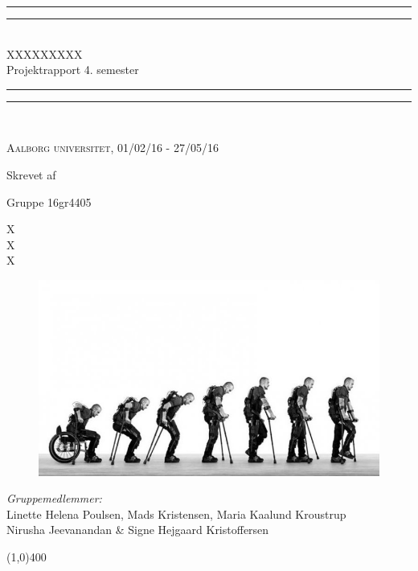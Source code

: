 \begin{center}
\vspace*{\baselineskip}
\rule{\textwidth}{1.6pt}\vspace*{-\baselineskip}\vspace*{2pt} %
\rule{\textwidth}{0.4pt}\\[\baselineskip] %

{\huge XXXXXXXXX\\[0.3\baselineskip] \LARGE Projektrapport 4. semester}\\[0.2\baselineskip] %

\rule{\textwidth}{0.4pt}\vspace*{-\baselineskip}\vspace{3.2pt} %
\rule{\textwidth}{1.6pt}\\[\baselineskip] %
\vspace*{3\baselineskip}

\scshape %
Aalborg universitet,  01/02/16 - 27/05/16\par %

\vspace*{2\baselineskip} %

Skrevet af \\
{\Large Gruppe 16gr4405\par}
\end{center} %
{\color{white}X \\ X \\ X \\}
\begin{figure}[H]
	\centering
	\begin{minipage}[b]{1\textwidth}
		\includegraphics[width=\textwidth]{figures/Forside}
	\end{minipage}
	\hfill
\end{figure}

\vspace*{\fill}
\begin{center}
	\textit{Gruppemedlemmer:}\\
	Linette Helena Poulsen, Mads Kristensen, Maria Kaalund Kroustrup \\
	Nirusha Jeevanandan \& Signe Hejgaard Kristoffersen
\end{center}
\begin{center}
\line(1,0){400}
\end{center}
